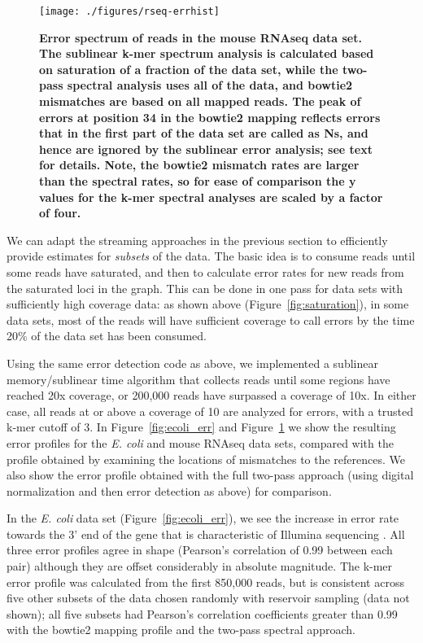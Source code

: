 \begin{figure}[!ht]
 \centerline{\texttt{[image: ./figures/rseq-errhist]}}
\caption{{\bf Error spectrum of reads in the mouse RNAseq data set.
    The sublinear k-mer spectrum analysis is calculated based on
    saturation of a fraction of the data set, while the two-pass
    spectral analysis uses all of the data, and bowtie2 mismatches are
    based on all mapped reads.  The peak of errors at position 34 in
    the bowtie2 mapping reflects errors that in the first part of the
    data set are called as Ns, and hence are ignored by the sublinear
    error analysis; see text for details. Note, the bowtie2 mismatch
    rates are larger than the spectral rates, so for ease of
    comparison the y values for the k-mer spectral analyses are scaled
    by a factor of four.}}
\label{fig:rseq_err}
\end{figure}



We can adapt the streaming approaches in the previous section to efficiently provide estimates
for {\em subsets} of the data.  The basic idea is to consume reads until some
reads have saturated, and then to calculate error rates for new reads from the
saturated loci in the graph.  This can be done in one pass for data sets with
sufficiently high coverage data: as shown above (Figure~\ref{fig:saturation}),
in some data sets, most of the reads will have sufficient coverage to call
errors by the time 20\% of the data set has been consumed.

Using the same error detection code as above, we implemented a sublinear
memory/sublinear time algorithm that collects reads until some regions have
reached 20x coverage, or 200,000 reads have surpassed a coverage of 10x.
In either case, all reads at or above a coverage of 10
are analyzed for errors, with a trusted k-mer cutoff of 3.  In
Figure~\ref{fig:ecoli_err} and Figure~\ref{fig:rseq_err} we show the resulting
error profiles for the {\em E. coli} and mouse RNAseq data sets, compared with
the profile obtained by examining the locations of mismatches to the
references. We also show the error profile obtained with the full two-pass
approach (using digital normalization and then error detection as above) for
comparison.

In the {\em E. coli} data set (Figure~\ref{fig:ecoli_err}), we see the increase
in error rate towards the 3' end of the gene that is characteristic of Illumina
sequencing \cite{biases}.  All three error profiles agree in shape (Pearson's
correlation of 0.99 between each pair) although they are offset considerably in
absolute magnitude. The k-mer error profile was calculated from the first
850,000 reads, but is consistent across five other subsets of the data chosen
randomly with reservoir sampling (data not shown); all five subsets had
Pearson's correlation coefficients greater than 0.99 with the bowtie2 mapping
profile and the two-pass spectral approach.

